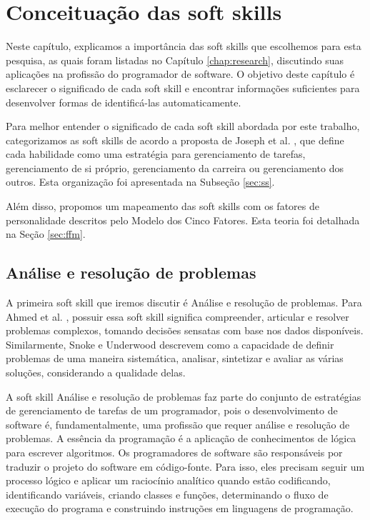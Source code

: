

\chapter{Conceituação das soft skills}

\label{chap:concepts}
\thispagestyle{empty} %

Neste capítulo, explicamos a importância das soft skills que escolhemos para esta pesquisa, as quais foram listadas no Capítulo \ref{chap:research}, discutindo suas aplicações na profissão do programador de software. O objetivo deste capítulo é esclarecer o significado de cada soft skill e encontrar informações suficientes para desenvolver formas de identificá-las automaticamente.

Para melhor entender o significado de cada soft skill abordada por este trabalho, categorizamos as soft skills de acordo a proposta de Joseph et al. \cite{joseph:99} \cite{joseph:10}, que define cada habilidade como uma estratégia para gerenciamento de tarefas, gerenciamento de si próprio, gerenciamento da carreira ou gerenciamento dos outros. Esta organização foi apresentada na Subseção \ref{sec:ss}.

Além disso, propomos um mapeamento das soft skills com os fatores de personalidade descritos pelo Modelo dos Cinco Fatores. Esta teoria foi detalhada na Seção \ref{sec:ffm}.

\section{Análise e resolução de problemas}

A primeira soft skill que iremos discutir é Análise e resolução de problemas. Para Ahmed et al. \cite{ahmed:12}, possuir essa soft skill significa compreender, articular e resolver problemas complexos, tomando decisões sensatas com base nos dados disponíveis. Similarmente, Snoke e Underwood \cite{snoke:01} descrevem como a capacidade de definir problemas de uma maneira sistemática, analisar, sintetizar e avaliar as várias soluções, considerando a qualidade delas.

A soft skill Análise e resolução de problemas faz parte do conjunto de estratégias de gerenciamento de tarefas de um programador, pois o desenvolvimento de software é, fundamentalmente, uma profissão que requer análise e resolução de problemas. A essência da programação é a aplicação de conhecimentos de lógica para escrever algoritmos. Os programadores de software são responsáveis por traduzir o projeto do software em código-fonte. Para isso, eles precisam seguir um processo lógico e aplicar um raciocínio analítico quando estão codificando, identificando variáveis, criando classes e funções, determinando o fluxo de execução do programa e construindo instruções em linguagens de programação. 

